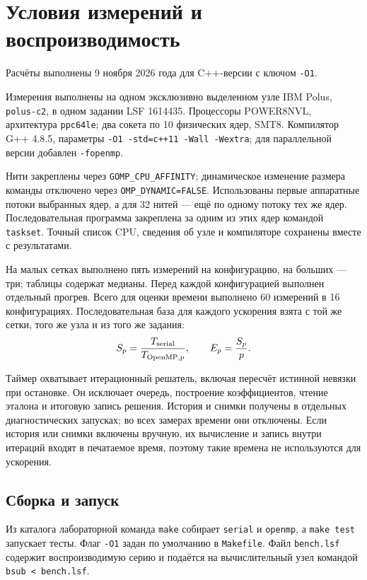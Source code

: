 \documentclass[12pt,a4paper]{article}
\begin{document}
\section{Условия измерений и воспроизводимость}
Расчёты выполнены 9 ноября 2026 года для C++-версии с ключом \texttt{-O1}.

Измерения выполнены на одном эксклюзивно выделенном узле IBM Polus, \texttt{polus-c2}, в одном задании LSF 1614435. Процессоры POWER8NVL, архитектура \texttt{ppc64le}; два сокета по 10 физических ядер, SMT8. Компилятор G++ 4.8.5, параметры
\texttt{-O1 -std=c++11 -Wall -Wextra}; для параллельной версии добавлен \texttt{-fopenmp}.

Нити закреплены через \texttt{GOMP\_CPU\_AFFINITY}; динамическое изменение размера команды отключено через \texttt{OMP\_DYNAMIC=FALSE}. Использованы первые аппаратные потоки выбранных ядер, а для 32 нитей --- ещё по одному потоку тех же ядер. Последовательная программа закреплена за одним из этих ядер командой \texttt{taskset}. Точный список CPU, сведения об узле и компиляторе сохранены вместе с результатами.

На малых сетках выполнено пять измерений на конфигурацию, на больших --- три; таблицы содержат медианы. Перед каждой конфигурацией выполнен отдельный прогрев. Всего для оценки времени выполнено 60 измерений в 16 конфигурациях. Последовательная база для каждого ускорения взята с той же сетки, того же узла и из того же задания:
\[
S_p=\frac{T_{\rm serial}}{T_{{\rm OpenMP},p}},\qquad E_p=\frac{S_p}{p}.
\]

Таймер охватывает итерационный решатель, включая пересчёт истинной невязки при остановке. Он исключает очередь, построение коэффициентов, чтение эталона и итоговую запись решения. История и снимки получены в отдельных диагностических запусках; во всех замерах времени они отключены. Если история или снимки включены вручную, их вычисление и запись внутри итераций входят в печатаемое время, поэтому такие времена не используются для ускорения.

\subsection{Сборка и запуск}
Из каталога лабораторной команда \texttt{make} собирает \texttt{serial} и \texttt{openmp}, а \texttt{make test} запускает тесты. Флаг \texttt{-O1} задан по умолчанию в \texttt{Makefile}. Файл \texttt{bench.lsf} содержит воспроизводимую серию и подаётся на вычислительный узел командой \texttt{bsub < bench.lsf}.
\end{document}
